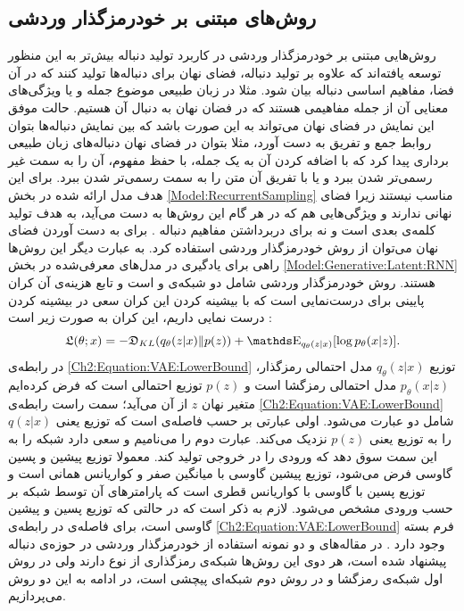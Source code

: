  \subsection{روش‌های مبتنی بر خودرمزگذار وردشی}
 روش‌هایی مبتنی بر خودرمزگذار وردشی  در کاربرد تولید دنباله بیش‌تر به این منظور توسعه یافته‌اند که علاوه بر تولید دنباله، فضای نهان برای دنباله‌ها تولید کنند که در آن فضا، مفاهیم اساسی دنباله بیان شود.
 مثلا در زبان طبیعی موضوع جمله و یا ویژگی‌های معنایی آن از جمله مفاهیمی هستند که در فضان نهان به دنبال آن هستیم. حالت موفق این نمایش در فضای نهان می‌تواند به این صورت باشد که بین نمایش دنباله‌ها بتوان روابط جمع و تفریق به دست آورد، مثلا بتوان در فضای نهان دنباله‌های زبان طبیعی برداری پیدا کرد که با اضافه کردن آن به یک جمله، با حفظ مفهوم، آن را به سمت غیر رسمی‌تر شدن ببرد و یا با تفریق آن متن را به سمت رسمی‌تر شدن ببرد. برای این هدف مدل ارائه شده در بخش \ref{Model:RecurrentSampling} مناسب نیستند زیرا فضای نهانی ندارند و ویژگی‌هایی  هم که در هر گام این روش‌ها به دست می‌آید، به هدف تولید کلمه‌ی بعدی است و نه برای دربرداشتن مفاهیم دنباله
  \cite{Bowman2016VAE}.
برای به دست آوردن فضای نهان می‌توان از روش خودرمزگذار وردشی استفاده کرد. به عبارت دیگر این روش‌ها راهی برای یادگیری در مدل‌های معرفی‌شده در بخش \ref{Model:Generative:Latent:RNN} هستند.
 \newline
روش خودرمزگذار وردشی شامل دو شبکه‌ی 
و
است و تابع هزینه‌ی آن کران پایینی برای درست‌نمایی است که با بیشینه کردن این کران سعی در بیشینه کردن درست نمایی داریم، این کران به صورت زیر است
\cite{Doersch16VAETut, Bowman2016VAE}:
\begin{equation}\label{Ch2:Equation:VAE:LowerBound}
\mathfrak{L}(\theta;x)=-\mathfrak{D}_{KL}(q_{\theta}(z|x) \Vert p(z))
+
\ME_{q_{\theta}(z|x)}[\log p_{\theta}(x|z)].
\end{equation}
در رابطه‌ی
\ref{Ch2:Equation:VAE:LowerBound}
توزیع
$q_{\theta}(z|x)$
مدل احتمالی رمزگذار،
$p_{\theta}(x|z)$
مدل احتمالی رمزگشا است و
$p(z)$
توزیع احتمالی است که فرض کرده‌ایم متغیر نهان
$z$
از آن می‌آید؛ سمت راست رابطه‌ی 
\ref{Ch2:Equation:VAE:LowerBound}
شامل دو عبارت می‌شود. اولی عبارتی بر حسب فاصله‌ی 
است که توزیع
 یعنی $q(z|x)$
را به توزیع
 یعنی $p(z)$
نزدیک می‌کند. عبارت دوم را
 می‌نامیم و سعی دارد شبکه را به این سمت سوق دهد که ورودی را در خروجی تولید کند. معمولا توزیع پیشین و پسین گاوسی فرض می‌شود، توزیع پیشین گاوسی با میانگین صفر و کواریانس همانی است و توزیع پسین با گاوسی  با کواریانس قطری است که پارامتر‌های آن توسط شبکه بر حسب ورودی مشخص می‌شود. لازم به ذکر است که در حالتی که توزیع پسین و پیشین گاوسی است، برای فاصله‌ی
 در رابطه‌ی
 \ref{Ch2:Equation:VAE:LowerBound}
 فرم بسته وجود دارد
 \cite{Doersch16VAETut, Bowman2016VAE}.
\newline
در مقاله‌های
\cite{Bowman2016VAE}
و
\cite{Yang2017ImprovedVAE}
دو نمونه استفاده از خودرمزگذار وردشی در حوزه‌ی دنباله ‌پیشنهاد شده است، هر دوی این روش‌ها شبکه‌ی رمزگذاری  از نوع
  دارند ولی  در  روش اول شبکه‌ی رمزگشا
  و در روش دوم شبکه‌ای پیچشی است، در ادامه به این دو روش می‌پردازیم.
